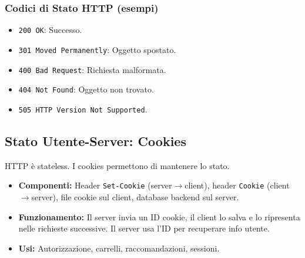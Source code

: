 \documentclass{article}
\begin{document}
\subsubsection{Codici di Stato HTTP (esempi)}
\begin{itemize}
    \item \texttt{200 OK}: Successo.
    \item \texttt{301 Moved Permanently}: Oggetto spostato.
    \item \texttt{400 Bad Request}: Richiesta malformata.
    \item \texttt{404 Not Found}: Oggetto non trovato.
    \item \texttt{505 HTTP Version Not Supported}.
\end{itemize}

\subsection{Stato Utente-Server: Cookies}
HTTP è stateless. I cookies permettono di mantenere lo stato.
\begin{itemize}
    \item \textbf{Componenti:} Header \texttt{Set-Cookie} (server$\rightarrow$client), header \texttt{Cookie} (client$\rightarrow$server), file cookie sul client, database backend sul server.
    \item \textbf{Funzionamento:} Il server invia un ID cookie, il client lo salva e lo ripresenta nelle richieste successive. Il server usa l'ID per recuperare info utente.
    \item \textbf{Usi:} Autorizzazione, carrelli, raccomandazioni, sessioni.
\end{itemize}
\end{document}
